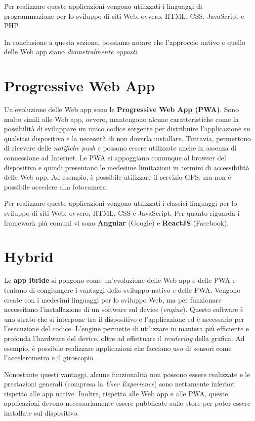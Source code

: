 Per realizzare queste applicazioni vengono utilizzati i linguaggi di programmazione per lo sviluppo di siti Web, ovvero, HTML, CSS, JavaScript e PHP.

In conclusione a questa sezione, possiamo notare che l'approccio nativo e quello delle Web app siano \textit{diametralmente opposti}.

\section{Progressive Web App}
Un'evoluzione delle Web app sono le \textbf{Progressive Web App (PWA)}. Sono molto simili alle Web app, ovvero, mantengono alcune caratteristiche come la possibilità di sviluppare un unico codice sorgente per distribuire l'applicazione su qualsiasi dispositivo e la necessità di non doverla installare. Tuttavia, permettono di ricevere delle \textit{notifiche push} e possono essere utilizzate anche in assenza di connessione ad Internet. Le PWA si appoggiano comunque al browser del dispositivo e quindi presentano le medesime limitazioni in termini di accessibilità delle Web app. Ad esempio, è possibile utilizzare il servizio GPS, ma non è possibile accedere alla fotocamera.

Per realizzare queste applicazioni vengono utilizzati i classici linguaggi per lo sviluppo di siti Web, ovvero, HTML, CSS e JavaScript. Per quanto riguarda i framework più comuni vi sono \textbf{Angular} (Google) e \textbf{ReactJS} (Facebook).

\section{Hybrid}
Le \textbf{app ibride} si pongono come un'evoluzione delle Web app e delle PWA e tentano di congiungere i vantaggi dello sviluppo nativo e delle PWA. Vengono create con i medesimi linguaggi per lo sviluppo Web, ma per funzionare necessitano l'installazione di un software sul device (\textit{engine}). Questo software è uno strato che si interpone tra il dispositivo e l'applicazione ed è necessario per l'esecuzione del codice. L'engine permette di utilizzare in maniera più efficiente e profonda l'hardware del device, oltre ad effettuare il \textit{rendering} della grafica. Ad esempio, è possibile realizzare applicazioni che facciano uso di sensori come l'accelerometro e il giroscopio.

Nonostante questi vantaggi, alcune funzionalità non possono essere realizzate e le prestazioni generali (compresa la \textit{User Experience}) sono nettamente inferiori rispetto alle app native. Inoltre, rispetto alle Web app e alle PWA, queste applicazioni devono necessariamente essere pubblicate sullo store per poter essere installate sul dispositivo. 

